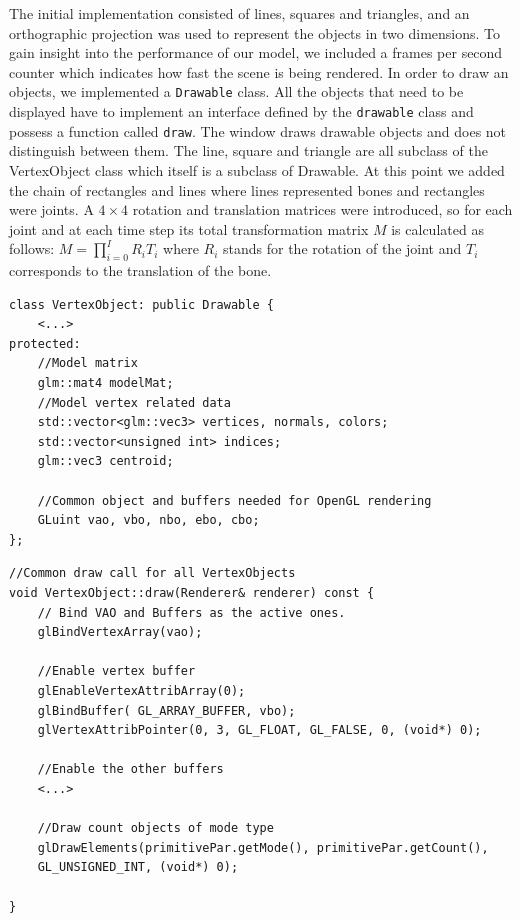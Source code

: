 \documentclass[paper=a4, fontsize=11pt]{scrartcl} %
\numberwithin{equation}{section} %
\numberwithin{figure}{section} %
\numberwithin{table}{section} %
\begin{document}
The initial implementation consisted of lines, squares and triangles, and an orthographic projection was used to represent the objects in two dimensions. To gain insight into the performance of our model, we included a frames per second counter which indicates how fast the scene is being rendered. In order to draw an objects, we implemented a \texttt{Drawable} class. All the objects that need to be displayed have to implement an interface defined by the \texttt{drawable} class and possess a function called \texttt{draw}. The window draws drawable objects and does not distinguish between them. The line, square and triangle are all subclass of the VertexObject class which itself is a subclass of Drawable. At this point we added the chain of rectangles and lines where lines represented bones and rectangles were joints. A \(4 \times 4\) rotation and translation matrices were introduced, so for each joint and at each time step its total transformation matrix $M$ is calculated as follows:  $M=\prod_{i=0}^I R_i T_i$ where \(R_i\) stands for the rotation of the joint and \(T_i\) corresponds to the translation of the bone. \\

\begin{mdframed}
\begin{scriptsize}
\begin{lstlisting}
class VertexObject: public Drawable {
	<...>
protected:
	//Model matrix
	glm::mat4 modelMat;
	//Model vertex related data
	std::vector<glm::vec3> vertices, normals, colors;
	std::vector<unsigned int> indices;
	glm::vec3 centroid;

	//Common object and buffers needed for OpenGL rendering
	GLuint vao, vbo, nbo, ebo, cbo;
};
\end{lstlisting}
\end{scriptsize}
\end{mdframed}

\begin{mdframed}
\begin{scriptsize}
\begin{lstlisting}
//Common draw call for all VertexObjects
void VertexObject::draw(Renderer& renderer) const {
	// Bind VAO and Buffers as the active ones.
	glBindVertexArray(vao);

	//Enable vertex buffer
	glEnableVertexAttribArray(0);
	glBindBuffer( GL_ARRAY_BUFFER, vbo);
	glVertexAttribPointer(0, 3, GL_FLOAT, GL_FALSE, 0, (void*) 0);
	
	//Enable the other buffers 
	<...>
		
	//Draw count objects of mode type
	glDrawElements(primitivePar.getMode(), primitivePar.getCount(),
	GL_UNSIGNED_INT, (void*) 0);
	
}
\end{lstlisting}
\end{scriptsize}
\end{mdframed}
\end{document}

